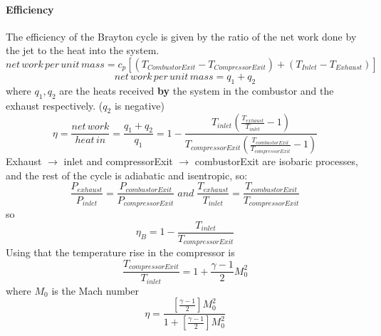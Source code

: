\documentclass[12pt,onecolumn]{IEEEtran}
\begin{document}
\paragraph{Efficiency}
The efficiency of the Brayton cycle is given by the ratio of the net work done by the jet to the heat into the system.
\begin{equation}
net\, work\, per\, unit\, mass = c_p [(T_{CombustorExit}-T_{CompressorExit}) + (T_{Inlet}-T_{Exhaust})]
\end{equation}
\begin{equation}
net\,work\,per\,unit\,mass = q_1 + q_2
\end{equation}
where $q_1,q_2$ are the heats received \textbf{by} the system in the combustor and the exhaust respectively. ($q_2$ is negative)
\begin{equation}
\eta = \frac{net\,work}{heat\,in} = \frac{q_1 + q_2}{q_1} = 1-\frac{T_{inlet}(\frac{T_{exhaust}}{T_{inlet}}-1)}{T_{compressorExit}(\frac{T_{combustorExit}}{T_{compressorExit}}-1)}
\end{equation}
Exhaust $\rightarrow$ inlet and compressorExit $\rightarrow$ combustorExit are isobaric processes, and the rest of the cycle is adiabatic and isentropic, so:
\begin{equation}
\frac{P_{exhaust}}{P_{inlet}} = \frac{P_{combustorExit}}{P_{compressorExit}}\;and\; \frac{T_{exhaust}}{T_{inlet}} = \frac{T_{combustorExit}}{T_{compressorExit}}
\end{equation}
so
\begin{equation}
\eta_B = 1 - \frac{T_{inlet}}{T_{compressorExit}} \label{eq:5}
\end{equation}
Using that the temperature rise in the compressor is
\begin{equation}
\frac{T_{compressorExit}}{T_{inlet}} = 1 + \frac{\gamma -1}{2}M_0^2
\end{equation}
where $M_0$ is the Mach number
\begin{equation}
\eta = \frac{[\frac{\gamma -1}{2}]M_0^2}{1+[\frac{\gamma -1}{2}]M_0^2}
\end{equation}
\end{document}
